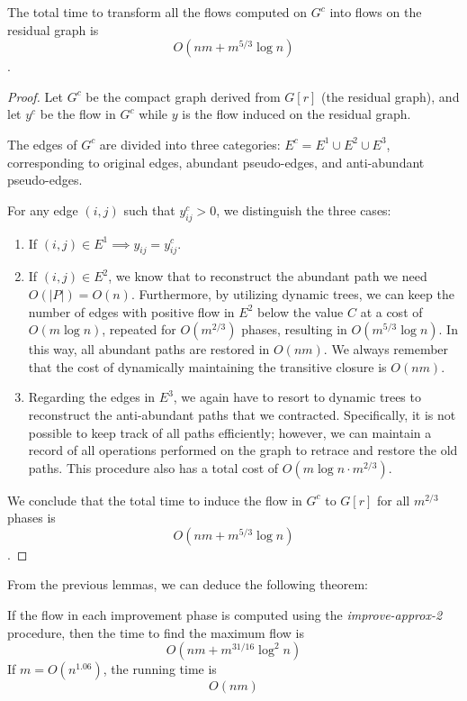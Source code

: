 \begin{lemma}
    The total time to transform all the flows computed on \( G^c \) into flows on the residual graph is 
    \[ O(nm + m^{5/3} \log n) \].
\end{lemma}
\begin{proof}
    Let \( G^c \) be the compact graph derived from \( G[r] \) (the residual graph), and let \( y^c \) be the flow in \( G^c \) while \( y \) is the flow induced on the residual graph.

    The edges of \( G^c \) are divided into three categories: \( E^c = E^1 \cup E^2 \cup E^3 \), corresponding to original edges, abundant pseudo-edges, and anti-abundant pseudo-edges.

    For any edge \( (i,j) \) such that \( y^c_{ij} > 0 \), we distinguish the three cases:
    \begin{enumerate}
        \item If \( (i,j) \in E^1 \implies y_{ij} = y^c_{ij} \).
        \item If \( (i,j) \in E^2 \), we know that to reconstruct the abundant path we need \( O(|P|) = O(n) \). Furthermore, by utilizing dynamic trees, we can keep the number of edges with positive flow in \( E^2 \) below the value \( C \) at a cost of \( O(m \log n) \), repeated for \( O(m^{2/3}) \) phases, resulting in \( O(m^{5/3} \log n) \). In this way, all abundant paths are restored in \( O(nm) \). We always remember that the cost of dynamically maintaining the transitive closure is \( O(nm) \).
        \item Regarding the edges in \( E^3 \), we again have to resort to dynamic trees to reconstruct the anti-abundant paths that we contracted. Specifically, it is not possible to keep track of all paths efficiently; however, we can maintain a record of all operations performed on the graph to retrace and restore the old paths. This procedure also has a total cost of \( O(m \log n \cdot m^{2/3}) \). 
    \end{enumerate}
    
    We conclude that the total time to induce the flow in \( G^c \) to \( G[r] \) for all \( m^{2/3} \) phases is 
    \[ O(nm + m^{5/3} \log n) \].
\end{proof}

From the previous lemmas, we can deduce the following theorem:

\begin{theorem}
    If the flow in each improvement phase is computed using the \textit{improve-approx-2} procedure, then the time to find the maximum flow is 
    \[ O(nm + m^{31/16} \log^2 n) \]
    If \( m = O(n^{1.06}) \), the running time is
    \[ O(nm) \]
\end{theorem}


\cleardoublepage